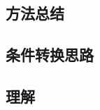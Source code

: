 \documentclass[a4paper,12pt]{article}
\begin{document}
    \subsection{方法总结}

    \begin{enumerate}

    \end{enumerate}

    \subsection{条件转换思路}

    \begin{enumerate}

    \end{enumerate}

    \subsection{理解}

    \begin{enumerate}
    \end{enumerate}
\end{document}
